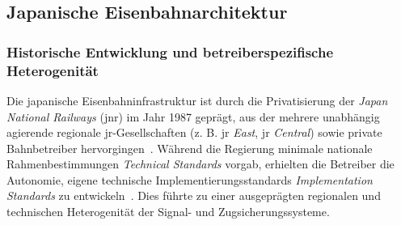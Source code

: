 \documentclass[runningheads]{res/llncs}
\begin{document}

\subsection{Japanische Eisenbahnarchitektur}
\label{sec:Japanische_Eisenbahnarchitektur}

\subsubsection{Historische Entwicklung und betreiberspezifische Heterogenität}
\label{sec:Historische_Entwicklung_und_betreiberspezifische_Heterogenität}
Die japanische Eisenbahninfrastruktur ist durch die Privatisierung der \textit{Japan National Railways} (\gls{jnr}) im Jahr 1987 geprägt, aus der mehrere unabhängig agierende regionale \gls{jr}-Gesellschaften (z. B. \gls{jr} \textit{East}, \gls{jr} \textit{Central}) sowie private Bahnbetreiber hervorgingen~\parencite[S. 47]{yanaseJapanese2011}. Während die Regierung minimale nationale Rahmenbestimmungen \textit{Technical Standards} vorgab, erhielten die Betreiber die Autonomie, eigene technische Implementierungsstandards \textit{Implementation Standards} zu entwickeln~\parencite[S. 48--49, 51]{yanaseJapanese2011}. Dies führte zu einer ausgeprägten regionalen und technischen Heterogenität der Signal- und Zugsicherungssysteme.

\end{document}
